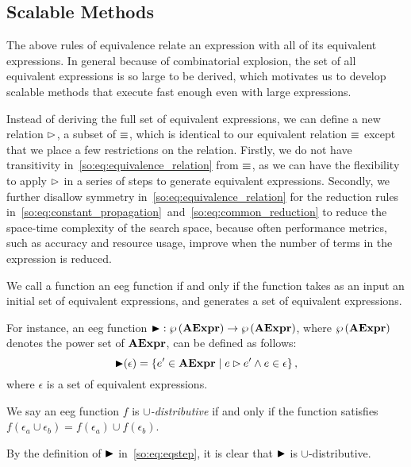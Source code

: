 \subsection{Scalable Methods}

The above rules of equivalence relate an expression with all of its equivalent
expressions.  In general because of combinatorial explosion, the set of all
equivalent expressions is so large to be derived, which motivates us to develop
scalable methods that execute fast enough even with large expressions.

Instead of deriving the full set of equivalent expressions, we can
define a new relation $\mathbin{\rhd}$, a subset of $\equiv$, which
is identical to our equivalent relation $\equiv$ except that we
place a few restrictions on the relation.  Firstly, we do not have
transitivity in~\eqref{so:eq:equivalence_relation} from $\equiv$, as
we can have the flexibility to apply $\mathbin{\rhd}$ in a series of steps
to generate equivalent expressions.  Secondly, we further disallow
symmetry in~\eqref{so:eq:equivalence_relation} for the reduction rules
in~\eqref{so:eq:constant_propagation}~and~\eqref{so:eq:common_reduction} to
reduce the space-time complexity of the search space, because often performance
metrics, such as accuracy and resource usage, improve when the number of terms
in the expression is reduced.

\begin{definition}
    We call a function an \gls{eeg} function if and only if the function takes
    as an input an initial set of equivalent expressions, and generates a set
    of equivalent expressions.
\end{definition}

For instance, an \gls{eeg} function $\operatorname{\blacktriangleright}: \wp\left({\mathbf{AExpr}}\right) \to
\wp\left({\mathbf{AExpr}}\right)$, where $\wp\left({\mathbf{AExpr}}\right)$ denotes the power set of
$\mathbf{AExpr}$, can be defined as follows:
\begin{equation}
    \operatorname{\blacktriangleright}(\epsilon) = \left\{
        e^\prime\in\mathbf{AExpr} \mid
        e \mathbin{\rhd} e^\prime \wedge e\in\epsilon\right\},
    \label{so:eq:eqstep}
\end{equation}
where $\epsilon$ is a set of equivalent expressions.

\begin{definition}
    We say an \gls{eeg} function $f$ is \emph{$\cup$-distributive} if and only
    if the function satisfies $f(\epsilon_a \cup \epsilon_b) = f(\epsilon_a)
    \cup f(\epsilon_b)$.
\end{definition}
\begin{corollary}
    By the definition of $\operatorname{\blacktriangleright}$ in~\eqref{so:eq:eqstep}, it is clear that
    $\operatorname{\blacktriangleright}$ is $\cup$-distributive.
    {}\label{so:cor:union}
\end{corollary}

